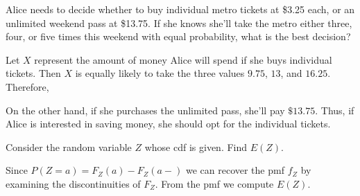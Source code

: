 \begin{examp}
Alice needs to decide whether to buy individual metro tickets at \$3.25 each, or an unlimited weekend pass at \$13.75. If she knows she'll take the metro either three, four, or five times this weekend with equal probability, what is the best decision?
\par
\noindent Let $X$ represent the amount of money Alice will spend if she buys individual tickets. Then $X$ is equally likely to take the three values $9.75$, $13$, and $16.25$. Therefore,
\par
\noindent On the other hand, if she purchases the unlimited pass, she'll pay $\$13.75$. Thus, if Alice is interested in saving money, she should opt for the individual tickets.
\end{examp}

\begin{examp}
Consider the random variable $Z$ whose cdf is given. Find $E(Z)$.
\renewcommand*{\arraystretch}{1.35}
\renewcommand*{\arraystretch}{1}
\par
\noindent Since $P(Z = a) = F_Z(a) - F_Z(a-)$ we can recover the pmf $f_Z$ by examining the discontinuities of $F_Z$. From the pmf we compute $E(Z)$.
\renewcommand*{\arraystretch}{1.35}
\vspace{1em}
\renewcommand*{\arraystretch}{1}
\end{examp}


